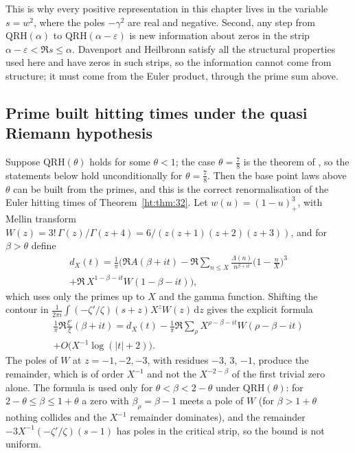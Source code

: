 This is why every positive representation in this chapter lives in the variable $s=w^2$, where the poles $-\gamma^2$ are real and negative. Second, any step from $\mathrm{QRH}(\alpha)$ to $\mathrm{QRH}(\alpha-\varepsilon)$ is new information about zeros in the strip $\alpha-\varepsilon<\Re s\le\alpha$. Davenport and Heilbronn satisfy all the structural properties used here and have zeros in such strips, so the information cannot come from structure; it must come from the Euler product, through the prime sum above.

\subsection{Prime built hitting times under the quasi Riemann hypothesis}
Suppose $\mathrm{QRH}(\theta)$ holds for some $\theta<1$; the case $\theta=\frac78$ is the theorem of \cite{OAI26a}, so the statements below hold unconditionally for $\theta=\frac78$. Then the base point laws above $\theta$ can be built from the primes, and this is the correct renormalisation of the Euler hitting times of Theorem~\ref{ht:thm:32}. Let $w(u)=(1-u)_+^3$, with Mellin transform $W(z)=3!\,\Gamma(z)/\Gamma(z+4)=6/(z(z+1)(z+2)(z+3))$, and for $\beta>\theta$ define
\begin{multline*}
d_X(t)=\frac1\pi\Big(\Re A(\beta+it)-\Re\sum_{n\le X}\frac{\Lambda(n)}{n^{\beta+it}}\Big(1-\frac nX\Big)^3\\
+\Re\,X^{1-\beta-it}W(1-\beta-it)\Big),
\end{multline*}
which uses only the primes up to $X$ and the gamma function. Shifting the contour in $\frac1{2\pi i}\int(-\zeta'/\zeta)(s+z)X^zW(z)\,\mathrm dz$ gives the explicit formula
\begin{multline*}
\frac1\pi\Re\frac{\xi'}{\xi}(\beta+it)=d_X(t)-\frac1\pi\Re\sum_\rho X^{\rho-\beta-it}W(\rho-\beta-it)\\
+O\big(X^{-1}\log(|t|+2)\big).
\end{multline*}
The poles of $W$ at $z=-1,-2,-3$, with residues $-3$, $3$, $-1$, produce the remainder, which is of order $X^{-1}$ and not the $X^{-2-\beta}$ of the first trivial zero alone. The formula is used only for $\theta<\beta<2-\theta$ under $\mathrm{QRH}(\theta)$: for $2-\theta\le\beta\le1+\theta$ a zero with $\beta_\rho=\beta-1$ meets a pole of $W$ (for $\beta>1+\theta$ nothing collides and the $X^{-1}$ remainder dominates), and the remainder $-3X^{-1}(-\zeta'/\zeta)(s-1)$ has poles in the critical strip, so the bound is not uniform.

